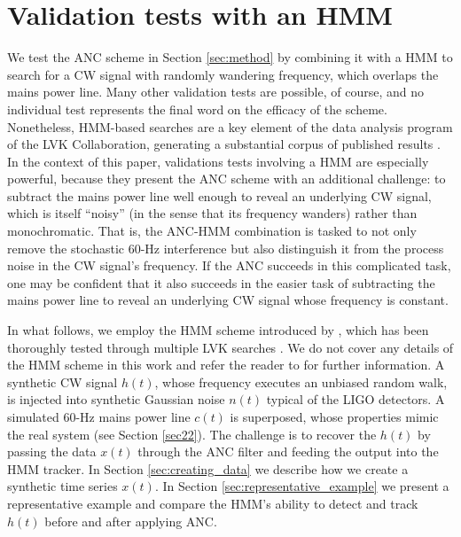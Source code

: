 \documentclass[pra,superscriptaddress,reprint,amsmath,amssymb,nofootinbib]{revtex4-2}
\begin{document}
\section{Validation tests with an HMM} \label{sec:results}
We test the ANC scheme in Section \ref{sec:method} by combining it with a HMM to search for a CW signal with randomly wandering frequency, which overlaps the mains power line. Many other validation tests are possible, of course, and no individual test represents the final word on the efficacy of the scheme. Nonetheless, HMM-based searches are a key element of the data analysis program of the LVK Collaboration, generating a substantial corpus of published results \citep{LIGOMarkov17,LIGOMarkov19,PhysRevD.99.084042,2018PhRvD..97d3013S,LIGOMarkov22,2023PhRvD.107f4062V}. In the context of this paper, validations tests involving a HMM are especially powerful, because they present the ANC scheme with an additional challenge: to subtract the mains power line well enough to reveal an underlying CW signal, which is itself ``noisy'' (in the sense that its frequency wanders) rather than monochromatic. That is, the ANC-HMM combination is tasked to not only remove the stochastic 60-Hz interference but also distinguish it from the process noise in the CW signal's frequency. If the ANC succeeds in this complicated task, one may be confident that it also succeeds in the easier task of subtracting the mains power line to reveal an underlying CW signal whose frequency is constant.  \newline 

In what follows, we employ the HMM scheme introduced by \citet{Suvorova2016PhRv}, which has been thoroughly tested through multiple LVK searches \cite{Piccinni2022,Riles2023,Wette2023}. We do not cover any details of the HMM scheme in this work and refer the reader to \citet{Suvorova2016PhRv} for further information. A synthetic CW signal $h(t)$, whose frequency executes an unbiased random walk, is injected into synthetic Gaussian noise $n(t)$ typical of the LIGO detectors. A simulated 60-Hz mains power line $c(t)$ is superposed, whose properties mimic the real system (see Section \ref{sec22}). The challenge is to recover the $h(t)$ by passing the data $x(t)$ through the ANC filter and feeding the output into the HMM tracker. In Section \ref{sec:creating_data} we describe how we create a synthetic time series $x(t)$. In Section \ref{sec:representative_example} we present a representative example and compare the HMM's ability to detect and track $h(t)$ before and after applying ANC. 
\end{document}
